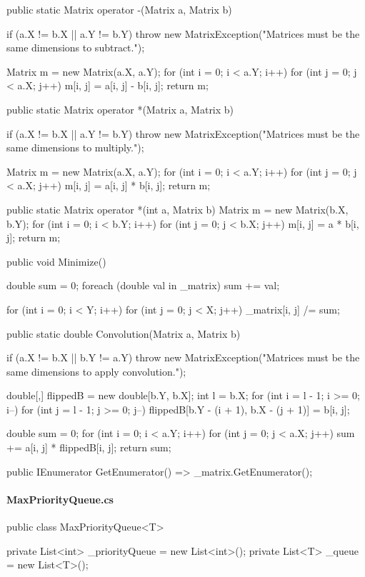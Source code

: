 \begin{flushleft}
\begin{cscode}
{    public static Matrix operator -(Matrix a, Matrix b)
    {
        if (a.X != b.X || a.Y != b.Y) throw new MatrixException("Matrices must be the same dimensions to subtract.");

        Matrix m = new Matrix(a.X, a.Y);
        for (int i = 0; i < a.Y; i++) for (int j = 0; j < a.X; j++) m[i, j] = a[i, j] - b[i, j];
        return m;
    }
    public static Matrix operator *(Matrix a, Matrix b)
    {
        if (a.X != b.X || a.Y != b.Y) throw new MatrixException("Matrices must be the same dimensions to multiply.");

        Matrix m = new Matrix(a.X, a.Y);
        for (int i = 0; i < a.Y; i++) for (int j = 0; j < a.X; j++) m[i, j] = a[i, j] * b[i, j];
        return m;
    }

    public static Matrix operator *(int a, Matrix b)
    {
        Matrix m = new Matrix(b.X, b.Y);
        for (int i = 0; i < b.Y; i++) for (int j = 0; j < b.X; j++) m[i, j] = a * b[i, j];
        return m;
    }

    public void Minimize()
    {
        double sum = 0;
        foreach (double val in _matrix) sum += val;

        for (int i = 0; i < Y; i++)
        {
            for (int j = 0; j < X; j++)
            {
                _matrix[i, j] /= sum;
            }
        }
    }

    public static double Convolution(Matrix a, Matrix b)
    {
        if (a.X != b.X || b.Y != a.Y) throw new MatrixException("Matrices must be the same dimensions to apply convolution.");

        double[,] flippedB = new double[b.Y, b.X];
        int l = b.X;
        for (int i = l - 1; i >= 0; i--) for (int j = l - 1; j >= 0; j--) flippedB[b.Y - (i + 1), b.X - (j + 1)] = b[i, j];

        double sum = 0;
        for (int i = 0; i < a.Y; i++) for (int j = 0; j < a.X; j++) sum += a[i, j] * flippedB[i, j];
        return sum;
    }

    public IEnumerator GetEnumerator() => _matrix.GetEnumerator();

}
    \end{cscode}
    
    \paragraph{MaxPriorityQueue.cs}
    \begin{cscode}
public class MaxPriorityQueue<T>
{
    private List<int> _priorityQueue = new List<int>();
    private List<T> _queue = new List<T>();

}
\end{cscode}
\end{flushleft}
